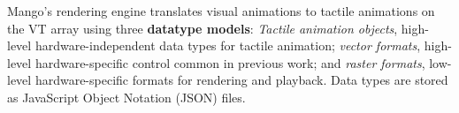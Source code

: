 Mango's rendering engine translates visual animations to tactile animations on the VT array
%
%
%
%
%
using three {\bf datatype models}:
\emph{Tactile animation objects}, high-level hardware-independent data types for tactile animation;
\emph{vector formats}, high-level hardware-specific control common in previous work; and
\emph{raster formats}, low-level hardware-specific formats for rendering and playback.
Data types are stored as JavaScript Object Notation (JSON) files.


